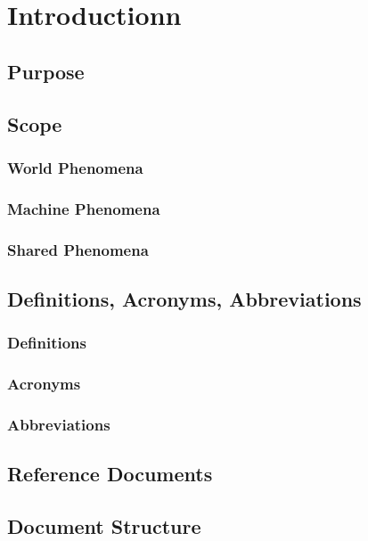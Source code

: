 \chapter{Introductionn}

\section{Purpose}

\section{Scope}
\subsection{World Phenomena}
\subsection{Machine Phenomena}
\subsection{Shared Phenomena}

\section{Definitions, Acronyms, Abbreviations}
\subsection{Definitions}
\subsection{Acronyms}
\subsection{Abbreviations}

\section{Reference Documents}

\section{Document Structure}